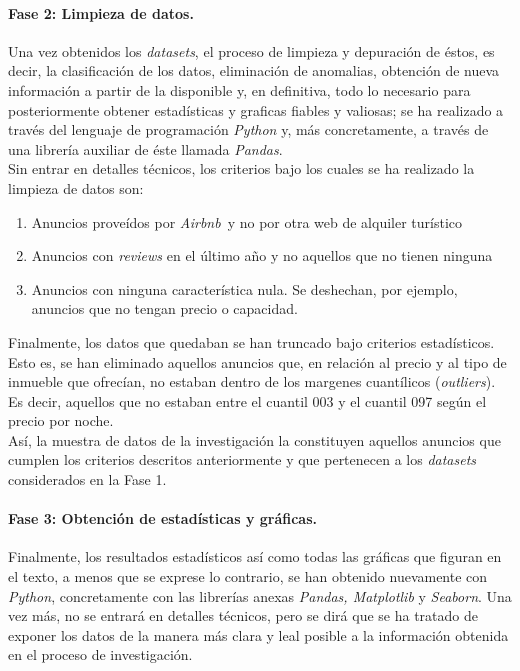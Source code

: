 \documentclass[a4paper,10pt]{article}
\newcommand*{\airbnb}{\textit{Airbnb}}
\begin{document}
\begin{multicols}{2}
            \paragraph*{\textbf{Fase 2: Limpieza de datos.}}
            Una vez obtenidos los \textit{datasets}, el proceso de limpieza y depuración de éstos, es decir, la clasificación de los datos, eliminación de 
            anomalias, obtención de nueva información a partir de la disponible y, en definitiva, todo lo necesario para posteriormente obtener estadísticas 
            y graficas fiables y valiosas; se ha realizado a través del lenguaje de programación \emph{Python} y, más concretamente, a través de una librería 
            auxiliar de éste llamada \emph{Pandas}. \\
            Sin entrar en detalles técnicos, los criterios bajo los cuales se ha realizado la limpieza de datos son:

            \begin{enumerate}
                \item Anuncios proveídos por \airbnb \ y no por otra web de alquiler turístico
                \item Anuncios con \textit{reviews} en el último año y no aquellos que no tienen ninguna
                \item Anuncios con ninguna característica nula. Se deshechan, por ejemplo, anuncios que no tengan precio o capacidad.  
            \end{enumerate}

            \noindent
            Finalmente, los datos que quedaban se han truncado bajo criterios estadísticos. Esto es, se han eliminado aquellos anuncios que, en relación al
            precio y al tipo de inmueble que ofrecían, no estaban dentro de los margenes cuantílicos (\textit{outliers}). Es decir, aquellos que no estaban entre
            el cuantil 003 y el cuantil 097 según el precio por noche. \\

            \noindent
            Así, la muestra de datos de la investigación la constituyen aquellos anuncios que cumplen los criterios descritos anteriormente y que 
            pertenecen a los \textit{datasets} considerados en la Fase 1.

            \clearpage
            \paragraph*{\textbf{Fase 3: Obtención de estadísticas y gráficas.}}
            Finalmente, los resultados estadísticos así como todas las gráficas que figuran en 
            el texto, a menos que se exprese lo contrario, se han obtenido nuevamente con \emph{Python}, concretamente con las librerías anexas \emph{Pandas, 
            Matplotlib} y \emph{Seaborn}. Una vez más, no se entrará en detalles técnicos, pero se dirá que se ha tratado de exponer los datos de la manera más 
            clara y leal posible a la información obtenida en el proceso de investigación. \\


\end{multicols}
\end{document}
